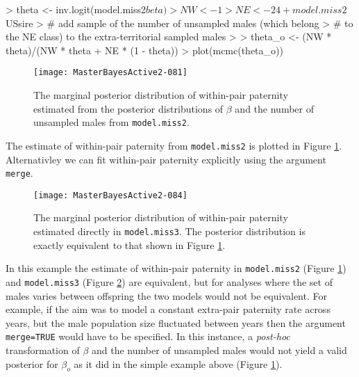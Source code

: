 \documentclass{article}
\begin{document}
\begin{Schunk}
\begin{Sinput}
> theta <- inv.logit(model.miss2$beta)
> NW <- 1
> NE <- 24 + model.miss2$USsire
> # add sample of the number of unsampled males (which belong
> # to the NE class) to the extra-territorial sampled males
>
> theta_o <- (NW * theta)/(NW * theta + NE * (1 - theta))
> plot(mcmc(theta_o))
\end{Sinput}
\end{Schunk}


\begin{figure}[!h]
\begin{center}
\texttt{[image: MasterBayesActive2-081]}
\end{center}
\caption{The marginal posterior distribution of within-pair paternity estimated from the posterior distributions of $\beta$ and the number of unsampled males from \texttt{model.miss2}.}
\label{EPP2Test-fig}
\end{figure}

The estimate of within-pair paternity from \texttt{model.miss2} is plotted in Figure \ref{EPP2Test-fig}.  Alternativley we can fit within-pair paternity explicitly using the argument \texttt{merge}. 

\begin{Schunk}
\end{Schunk}


\begin{figure}[!h]
\begin{center}
\texttt{[image: MasterBayesActive2-084]}
\end{center}
\caption{The marginal posterior distribution of within-pair paternity estimated directly in \texttt{model.miss3}. The posterior distribution is exactly equivalent to that shown in Figure \ref{EPP2Test-fig}.}
\label{EPPmerge-fig}
\end{figure}


In this example the estimate of within-pair paternity in \texttt{model.miss2} (Figure \ref{EPP2Test-fig}) and \texttt{model.miss3} (Figure \ref{EPPmerge-fig}) are equivalent, but for analyses where the set of males varies between offspring the two models would not be equivalent.  For example, if the aim was to model a constant extra-pair paternity rate across years, but the male population size fluctuated between years then the argument \texttt{merge=TRUE} would have to be specified.  In this instance, a \emph{post-hoc} transformation of $\beta$ and the number of unsampled males would not yield a valid posterior for $\beta_{o}$ as it did in the simple example above (Figure \ref{EPP2Test-fig}).   
\end{document}
